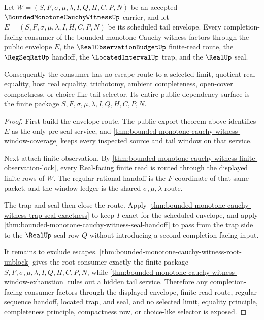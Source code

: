 \begin{theorem}
\label{thm:bounded-monotone-cauchy-witness-completion-consumer-nonescape}
Let $W=(S,F,\sigma,\mu,\lambda,I,Q,H,C,P,N)$ be an accepted $\BoundedMonotoneCauchyWitnessUp$ carrier, and let $E=(S,F,\sigma,\mu,\lambda,I,H,C,P,N)$ be its scheduled tail envelope. Every completion-facing consumer of the bounded monotone Cauchy witness factors through the public envelope $E$, the $\RealObservationBudgetUp$ finite-read route, the $\RegSeqRatUp$ handoff, the $\LocatedIntervalUp$ trap, and the $\RealUp$ seal.

Consequently the consumer has no escape route to a selected limit, quotient real equality, host real equality, trichotomy, ambient completeness, open-cover compactness, or choice-like tail selector. Its entire public dependency surface is the finite package $S,F,\sigma,\mu,\lambda,I,Q,H,C,P,N$.
\end{theorem}
\begin{proof}
First build the envelope route. The public export theorem above identifies $E$ as the only pre-seal service, and \autoref{thm:bounded-monotone-cauchy-witness-window-coverage} keeps every inspected source and tail window on that service.

Next attach finite observation. By \autoref{thm:bounded-monotone-cauchy-witness-finite-observation-lock}, every Real-facing finite read is routed through the displayed finite rows of $W$. The regular rational handoff is the $F$ coordinate of that same packet, and the window ledger is the shared $\sigma,\mu,\lambda$ route.

The trap and seal then close the route. Apply \autoref{thm:bounded-monotone-cauchy-witness-trap-seal-exactness} to keep $I$ exact for the scheduled envelope, and apply \autoref{thm:bounded-monotone-cauchy-witness-seal-handoff} to pass from the trap side to the $\RealUp$ seal row $Q$ without introducing a second completion-facing input.

It remains to exclude escapes. \autoref{thm:bounded-monotone-cauchy-witness-root-unblock} gives the root consumer exactly the finite package $S,F,\sigma,\mu,\lambda,I,Q,H,C,P,N$, while \autoref{thm:bounded-monotone-cauchy-witness-window-exhaustion} rules out a hidden tail service. Therefore any completion-facing consumer factors through the displayed envelope, finite-read route, regular-sequence handoff, located trap, and seal, and no selected limit, equality principle, completeness principle, compactness row, or choice-like selector is exposed.
\end{proof}

